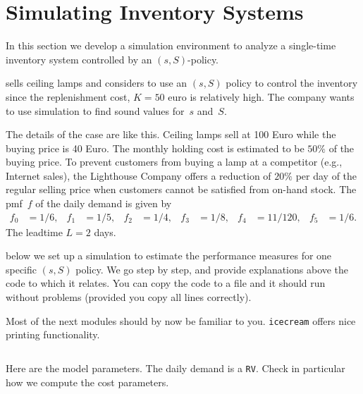 \documentclass[queueing-book.tex]{subfiles}
\begin{document}
\section{Simulating Inventory Systems}
\label{sec:simul-invent-syst}

In this section we develop a simulation environment to analyze a single-time inventory system controlled by an $(s,S)$-policy.

 sells ceiling lamps and considers to use an $(s,S)$ policy to control the inventory since the replenishment cost, $K=50$ euro is relatively high. The company wants to use simulation to find sound values for~$s$  and~$S$.

The details of the case are like this.
Ceiling lamps sell at 100 Euro while the buying price is 40 Euro.
The monthly holding cost is estimated to be $50\%$ of the buying price.
To prevent customers from buying a lamp at a competitor (e.g., Internet sales), the Lighthouse Company offers a reduction of $20\%$ per day of the regular selling price when customers cannot be satisfied from on-hand stock.
The pmf~$f$ of the daily demand is given by
  \begin{align*}
    f_{0} &= 1/6, &   f_{1} &= 1/5, &  f_{2}&= 1/4, &
    f_{3} &= 1/8, &  f_{4} &= 11/120, &  f_{5} &= 1/6.
  \end{align*}
The leadtime $L=2$ days.

 below we set up a simulation to estimate the performance measures for one specific $(s,S)$ policy.
We go step by step, and provide explanations above the code to which it relates.
You can copy the code to a file and it should run without problems (provided you copy all lines correctly).



Most of the next modules should by now be familiar to you. \texttt{icecream} offers nice printing functionality.
\inputminted[firstline=2, lastline=6]{python}{../code/ss_inventory_simulation.py} %



Here are the model parameters.
The daily demand is a \texttt{RV}.
Check in particular how we compute the cost parameters.

\inputminted[firstline=15, lastline=20]{python}{../code/ss_inventory_simulation.py} %
\end{document}
